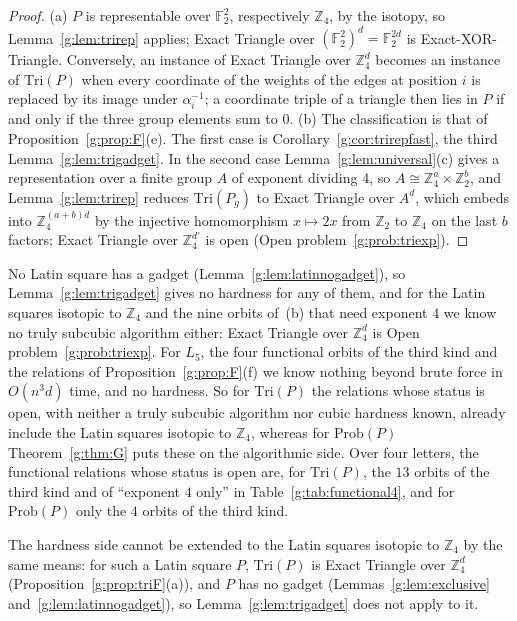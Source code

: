 \documentclass[11pt]{article}
\theoremstyle{definition}
\theoremstyle{remark}
\newcommand{\Z}{\mathbb{Z}}
\newcommand{\F}{\mathbb{F}_2}
\newcommand{\Prob}{\mathrm{Prob}}
\begin{document}
\begin{proof}
(a) $P$ is representable over $\F^2$, respectively $\Z_4$, by the isotopy, so Lemma~\ref{g:lem:trirep} applies; Exact Triangle over $(\F^2)^d=\F^{2d}$ is Exact-XOR-Triangle. Conversely, an instance of Exact Triangle over $\Z_4^d$ becomes an instance of $\mathrm{Tri}(P)$ when every coordinate of the weights of the edges at position $i$ is replaced by its image under $\alpha_i^{-1}$; a coordinate triple of a triangle then lies in $P$ if and only if the three group elements sum to $0$. (b) The classification is that of Proposition~\ref{g:prop:F}(e). The first case is Corollary~\ref{g:cor:trirepfast}, the third Lemma~\ref{g:lem:trigadget}. In the second case Lemma~\ref{g:lem:universal}(c) gives a representation over a finite group $A$ of exponent dividing $4$, so $A\cong\Z_4^a\times\Z_2^b$, and Lemma~\ref{g:lem:trirep} reduces $\mathrm{Tri}(P_g)$ to Exact Triangle over $A^d$, which embeds into $\Z_4^{(a+b)d}$ by the injective homomorphism $x\mapsto2x$ from $\Z_2$ to $\Z_4$ on the last $b$ factors; Exact Triangle over $\Z_4^{d'}$ is open (Open problem~\ref{g:prob:triexp}).
\end{proof}

No Latin square has a gadget (Lemma~\ref{g:lem:latinnogadget}), so Lemma~\ref{g:lem:trigadget} gives no hardness for any of them, and for the Latin squares isotopic to $\Z_4$ and the nine orbits of~(b) that need exponent $4$ we know no truly subcubic algorithm either: Exact Triangle over $\Z_4^d$ is Open problem~\ref{g:prob:triexp}. For $L_5$, the four functional orbits of the third kind and the relations of Proposition~\ref{g:prop:F}(f) we know nothing beyond brute force in $O(n^3d)$ time, and no hardness. So for $\mathrm{Tri}(P)$ the relations whose status is open, with neither a truly subcubic algorithm nor cubic hardness known, already include the Latin squares isotopic to $\Z_4$, whereas for $\Prob(P)$ Theorem~\ref{g:thm:G} puts these on the algorithmic side. Over four letters, the functional relations whose status is open are, for $\mathrm{Tri}(P)$, the $13$ orbits of the third kind and of ``exponent $4$ only'' in Table~\ref{g:tab:functional4}, and for $\Prob(P)$ only the $4$ orbits of the third kind.

The hardness side cannot be extended to the Latin squares isotopic to $\Z_4$ by the same means: for such a Latin square $P$, $\mathrm{Tri}(P)$ is Exact Triangle over $\Z_4^d$ (Proposition~\ref{g:prop:triF}(a)), and $P$ has no gadget (Lemmas~\ref{g:lem:exclusive} and~\ref{g:lem:latinnogadget}), so Lemma~\ref{g:lem:trigadget} does not apply to it.
\end{document}
